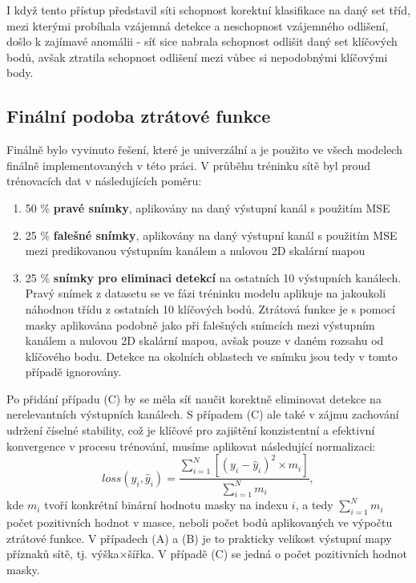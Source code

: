 I když tento přístup představil síti schopnost korektní klasifikace na daný set tříd, mezi kterými probíhala vzájemná detekce a neschopnost vzájemného odlišení, došlo k zajímavé anomálii - síť sice nabrala schopnost odlišit daný set klíčových bodů, avšak ztratila schopnost odlišení mezi vůbec si nepodobnými klíčovými body.

\subsection{Finální podoba ztrátové funkce}
\label{subsec:Chapter473_final_loss}

Finálně bylo vyvinuto řešení, které je univerzální a je použito ve všech modelech finálně implementovaných v této práci. V průběhu tréninku sítě byl proud trénovacích dat v následujících poměru:
\begin{enumerate}[label=(\Alph*)]
    \item 50 \% \textbf{pravé snímky}, aplikovány na daný výstupní kanál s použitím MSE
    \item 25 \% \textbf{falešné snímky}, aplikovány na daný výstupní kanál s použitím MSE mezi predikovanou výstupním kanálem a nulovou 2D skalární mapou
    \item 25 \% \textbf{snímky pro eliminaci detekcí} na ostatních 10 výstupních kanálech. Pravý snímek z datasetu se ve fázi tréninku modelu aplikuje na jakoukoli náhodnou třídu z ostatních 10 klíčových bodů. Ztrátová funkce je s pomocí masky aplikována podobně jako při falešných snímcích mezi výstupním kanálem a nulovou 2D skalární mapou, avšak pouze v daném rozsahu od klíčového bodu. Detekce na okolních oblastech ve snímku jsou tedy v tomto případě ignorovány.
\end{enumerate}
Po přidání případu (C) by se měla síť naučit korektně eliminovat detekce na nerelevantních výstupních kanálech. S případem (C) ale také v zájmu zachování udržení číselné stability, což je klíčové pro zajištění konzistentní a efektivní konvergence v procesu trénování, musíme aplikovat následující normalizaci:
\begin{equation}
loss(y_i, \hat{y}_i) = \frac{\sum_{i=1}^{N} [(y_i - \hat{y}_i)^2\times m_i]}{\sum_{i=1}^{N} m_i},
\end{equation}
kde $m_i$ tvoří konkrétní binární hodnotu masky na indexu $i$, a tedy $\sum_{i=1}^{N} m_i$ počet pozitivních hodnot v masce, neboli počet bodů aplikovaných ve výpočtu ztrátové funkce. V případech (A) a (B) je to prakticky velikost výstupní mapy příznaků sítě, tj. výška$\times$šířka. V případě (C) se jedná o počet pozitivních hodnot masky.

